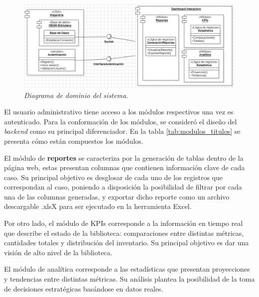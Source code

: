 \documentclass[spanish]{ieee_upb}
\begin{document}
\begin{figure}[htpb] 
	\centering
	\includegraphics[width=0.9\linewidth]{img/Diagramas/dominio.png}
	\vspace{-1mm}
	\caption[Diagrama de dominio]{\textit{Diagrama de dominio del sistema.}}
	\label{fig:domain} 
\end{figure}

El usuario administrativo tiene acceso a los módulos respectivos una vez es autenticado. Para la conformación de los módulos, se consideró el diseño del \textit{backend} como su principal diferenciador. En la tabla \ref{tab:modulos_titulos} se presenta cómo están compuestos los módulos.

\vspace{0.3cm}
El módulo de \textbf{reportes}  se caracteriza por la generación de tablas dentro de la página web, estas presentan columnas que contienen información clave de cada caso. Su principal objetivo es desglosar de cada uno de los registros que correspondan al caso, poniendo a disposición la posibilidad de filtrar por cada una de las columnas generadas, y exportar dicho reporte como un archivo descargable .xlsX para ser ejecutado en la herramienta Excel. 

\vspace{0.3cm}
Por otro lado, el módulo de KPIs corresponde a la información en tiempo real que describe el estado de la biblioteca: comparaciones entre distintas métricas, cantidades totales y distribución del inventario. Su principal objetivo es dar una visión de alto nivel de la biblioteca.

\vspace{0.3cm}
El módulo de analítica corresponde a las estadísticas que presentan proyecciones y tendencias entre distintas métricas. Su análisis plantea la posibilidad de la toma de decisiones estratégicas basándose en datos reales. 
\end{document}
